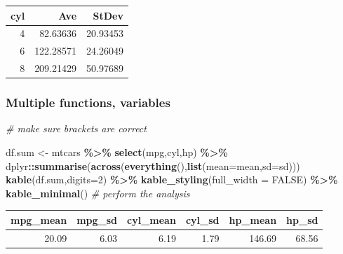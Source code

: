 \documentclass[
]{article}
\newenvironment{Shaded}{\begin{snugshade}}{\end{snugshade}}
\newcommand{\AttributeTok}[1]{\textcolor[rgb]{0.13,0.29,0.53}{#1}}
\newcommand{\CommentTok}[1]{\textcolor[rgb]{0.56,0.35,0.01}{\textit{#1}}}
\newcommand{\ConstantTok}[1]{\textcolor[rgb]{0.56,0.35,0.01}{#1}}
\newcommand{\DecValTok}[1]{\textcolor[rgb]{0.00,0.00,0.81}{#1}}
\newcommand{\FunctionTok}[1]{\textcolor[rgb]{0.13,0.29,0.53}{\textbf{#1}}}
\newcommand{\NormalTok}[1]{#1}
\newcommand{\OtherTok}[1]{\textcolor[rgb]{0.56,0.35,0.01}{#1}}
\newcommand{\SpecialCharTok}[1]{\textcolor[rgb]{0.81,0.36,0.00}{\textbf{#1}}}
\begin{document}
\begin{table}
\centering
\begin{tabular}{r|r|r}
\hline
cyl & Ave & StDev\\
\hline
4 & 82.63636 & 20.93453\\
\hline
6 & 122.28571 & 24.26049\\
\hline
8 & 209.21429 & 50.97689\\
\hline
\end{tabular}
\end{table}

\hypertarget{multiple-functions-variables}{%
\subsubsection{Multiple functions, variables}\label{multiple-functions-variables}}

\begin{Shaded}
\begin{Highlighting}[]
\CommentTok{\# make sure brackets are correct}

\NormalTok{df.sum }\OtherTok{\textless{}{-}}\NormalTok{ mtcars }\SpecialCharTok{\%\textgreater{}\%}  \FunctionTok{select}\NormalTok{(mpg,cyl,hp) }\SpecialCharTok{\%\textgreater{}\%}
\NormalTok{  dplyr}\SpecialCharTok{::}\FunctionTok{summarise}\NormalTok{(}\FunctionTok{across}\NormalTok{(}\FunctionTok{everything}\NormalTok{(),}\FunctionTok{list}\NormalTok{(}\AttributeTok{mean=}\NormalTok{mean,}\AttributeTok{sd=}\NormalTok{sd)))}
\FunctionTok{kable}\NormalTok{(df.sum,}\AttributeTok{digits=}\DecValTok{2}\NormalTok{) }\SpecialCharTok{\%\textgreater{}\%} \FunctionTok{kable\_styling}\NormalTok{(}\AttributeTok{full\_width =} \ConstantTok{FALSE}\NormalTok{) }\SpecialCharTok{\%\textgreater{}\%}
  \FunctionTok{kable\_minimal}\NormalTok{() }\CommentTok{\# perform the analysis}
\end{Highlighting}
\end{Shaded}

\begin{table}
\centering
\begin{tabular}{r|r|r|r|r|r}
\hline
mpg\_mean & mpg\_sd & cyl\_mean & cyl\_sd & hp\_mean & hp\_sd\\
\hline
20.09 & 6.03 & 6.19 & 1.79 & 146.69 & 68.56\\
\hline
\end{tabular}
\end{table}
\end{document}
